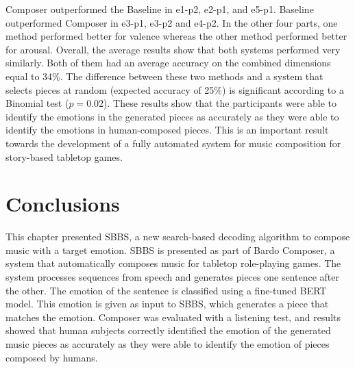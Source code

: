Composer outperformed the Baseline in e1-p2, e2-p1, and e5-p1. Baseline outperformed Composer in e3-p1, e3-p2 and e4-p2. In the other four parts, one method performed better for valence whereas the other method performed better for arousal. Overall, the average results show that both systems performed very similarly. Both of them had an average accuracy on the combined dimensions equal to 34\%. The difference between these two methods and a system that selects pieces at random (expected accuracy of 25\%) is significant according to a Binomial test ($p = 0.02$).
These results show that the  participants  were  able  to  identify  the  emotions  in  the generated pieces as accurately as they were able to identify the emotions in human-composed pieces. This is an important result towards the development of a fully automated system for music composition for story-based tabletop games.

\section{Conclusions}

This chapter presented SBBS, a new search-based decoding algorithm to compose music with a target emotion. SBBS is presented as part of Bardo Composer, a system that automatically composes music for tabletop role-playing games. The system processes sequences from speech and generates pieces one sentence after the other. The emotion of the sentence is classified using a fine-tuned BERT model. This emotion is given as input to SBBS, which generates a piece that matches the emotion. Composer was evaluated with a listening test, and results showed that human subjects correctly identified the emotion of the generated music pieces as accurately as they were able to identify the emotion of pieces composed by humans.
